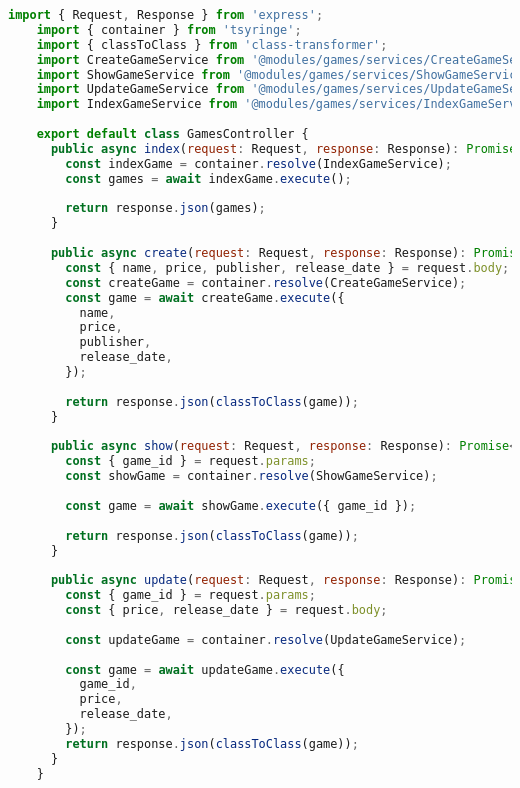 \begin{lstlisting}[language=JavaScript, caption={GamesController.ts},captionpos=b, label=alg:gamescontroller]
    import { Request, Response } from 'express';
    import { container } from 'tsyringe';
    import { classToClass } from 'class-transformer';
    import CreateGameService from '@modules/games/services/CreateGameService';
    import ShowGameService from '@modules/games/services/ShowGameService';
    import UpdateGameService from '@modules/games/services/UpdateGameService';
    import IndexGameService from '@modules/games/services/IndexGameService';
    
    export default class GamesController {
      public async index(request: Request, response: Response): Promise<Response> {
        const indexGame = container.resolve(IndexGameService);
        const games = await indexGame.execute();
    
        return response.json(games);
      }
    
      public async create(request: Request, response: Response): Promise<Response> {
        const { name, price, publisher, release_date } = request.body;
        const createGame = container.resolve(CreateGameService);
        const game = await createGame.execute({
          name,
          price,
          publisher,
          release_date,
        });
    
        return response.json(classToClass(game));
      }
    
      public async show(request: Request, response: Response): Promise<Response> {
        const { game_id } = request.params;
        const showGame = container.resolve(ShowGameService);
    
        const game = await showGame.execute({ game_id });
    
        return response.json(classToClass(game));
      }
    
      public async update(request: Request, response: Response): Promise<Response> {
        const { game_id } = request.params;
        const { price, release_date } = request.body;
    
        const updateGame = container.resolve(UpdateGameService);
    
        const game = await updateGame.execute({
          game_id,
          price,
          release_date,
        });
        return response.json(classToClass(game));
      }
    }    
\end{lstlisting}
